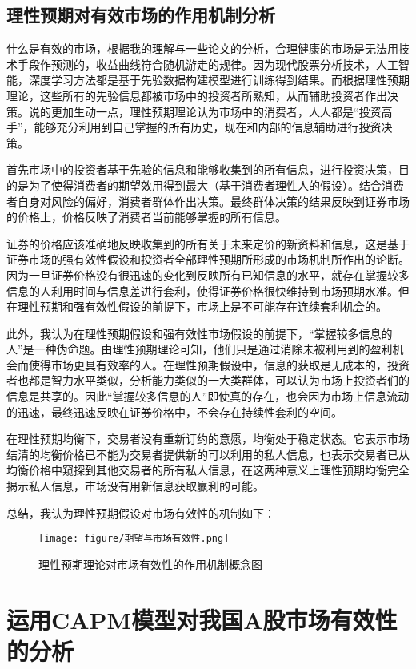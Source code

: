 \documentclass{xjtureport}
\begin{document}
\subsection{理性预期对有效市场的作用机制分析}
什么是有效的市场，根据我的理解与一些论文的分析\cite{}，合理健康的市场是无法用技术手段作预测的，收益曲线符合随机游走的规律。因为现代股票分析技术，人工智能，深度学习方法都是基于先验数据构建模型进行训练得到结果。而根据理性预期理论，这些所有的先验信息都被市场中的投资者所熟知，从而辅助投资者作出决策。说的更加生动一点，理性预期理论认为市场中的消费者，人人都是“投资高手”，能够充分利用到自己掌握的所有历史，现在和内部的信息辅助进行投资决策。
\par 首先市场中的投资者基于先验的信息和能够收集到的所有信息，进行投资决策，目的是为了使得消费者的期望效用得到最大（基于消费者理性人的假设）。结合消费者自身对风险的偏好，消费者群体作出决策。最终群体决策的结果反映到证券市场的价格上，价格反映了消费者当前能够掌握的所有信息。
\par 证券的价格应该准确地反映收集到的所有关于未来定价的新资料和信息，这是基于证券市场的强有效性假设和投资者全部理性预期所形成的市场机制所作出的论断。因为一旦证券价格没有很迅速的变化到反映所有已知信息的水平，就存在掌握较多信息的人利用时间与信息差进行套利，使得证券价格很快维持到市场预期水准。但在理性预期和强有效性假设的前提下，市场上是不可能存在连续套利机会的。
\par 此外，我认为在理性预期假设和强有效性市场假设的前提下，“掌握较多信息的人”是一种伪命题。由理性预期理论可知，他们只是通过消除未被利用到的盈利机会而使得市场更具有效率的人。在理性预期假设中，信息的获取是无成本的，投资者也都是智力水平类似，分析能力类似的一大类群体，可以认为市场上投资者们的信息是共享的。因此“掌握较多信息的人”即使真的存在，也会因为市场上信息流动的迅速，最终迅速反映在证券价格中，不会存在持续性套利的空间。
\par 在理性预期均衡下，交易者没有重新订约的意愿，均衡处于稳定状态。它表示市场结清的均衡价格已不能为交易者提供新的可以利用的私人信息，也表示交易者已从均衡价格中窥探到其他交易者的所有私人信息，在这两种意义上理性预期均衡完全揭示私人信息，市场没有用新信息获取赢利的可能。
\par 总结，我认为理性预期假设对市场有效性的机制如下：
\begin{figure}[H]
    \begin{center}
        \texttt{[image: figure/期望与市场有效性.png]}
    \end{center}
    \caption{理性预期理论对市场有效性的作用机制概念图}
\end{figure}
\clearpage
\section{运用CAPM模型对我国A股市场有效性的分析}
\end{document}
